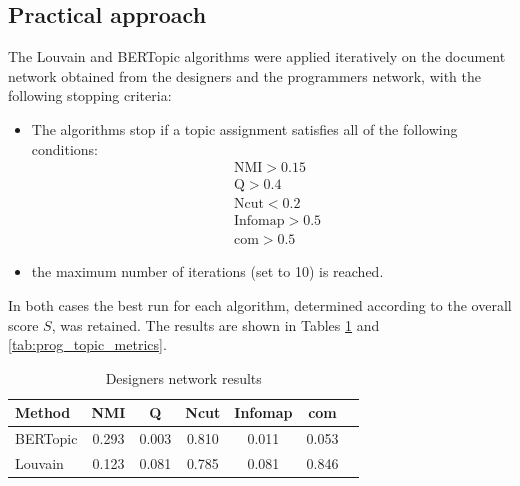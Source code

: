 \documentclass[conference]{IEEEtran}
\begin{document}
\subsection{Practical approach}
The Louvain and BERTopic algorithms were applied iteratively on the document network obtained from the designers and the programmers network, with the following stopping criteria:
\begin{itemize}
    \item The algorithms stop if a topic assignment satisfies all of the following conditions:
    \begin{align*}
        &\text{NMI} > 0.15 \\
        &\text{Q} > 0.4 \\
        &\text{Ncut} < 0.2 \\
        &\text{Infomap} > 0.5 \\
        &\text{com} > 0.5
    \end{align*}
    \item the maximum number of iterations (set to 10) is reached.
\end{itemize}
In both cases the best run for each algorithm, determined according to the overall score $S$, was retained. The results are shown in Tables \ref{tab:des_topic_metrics} and \ref{tab:prog_topic_metrics}.
\begin{table}[htbp]
\centering
\caption{Designers network results}
\label{tab:des_topic_metrics}
\begin{tabular}{l c c c c c c}
\hline
Method & NMI & Q & Ncut & Infomap & com \\
\hline
BERTopic & 0.293 & 0.003 & 0.810 & 0.011 & 0.053 \\
Louvain & 0.123 & 0.081 & 0.785 & 0.081 & 0.846 \\
\hline
\end{tabular}
\end{table}
\end{document}
